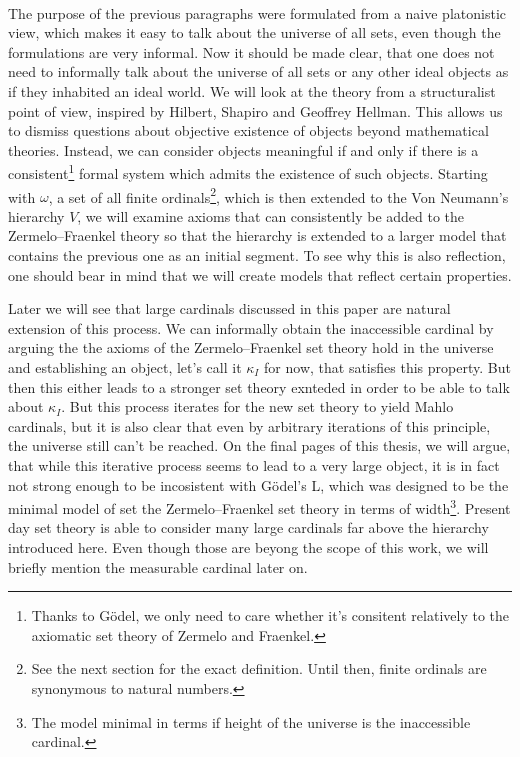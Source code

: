 \

The purpose of the previous paragraphs were formulated from a naive platonistic view, which makes it easy to talk about the universe of all sets, even though the formulations are very informal. Now it should be made clear, that one does not need to informally talk about the universe of all sets or any other ideal objects as if they inhabited an ideal world. We will look at the theory from a structuralist point of view, inspired by Hilbert, Shapiro and Geoffrey Hellman. This allows us to dismiss questions about objective existence of objects beyond mathematical theories. Instead, we can consider objects  meaningful if and only if there is a consistent\footnote{Thanks to Gödel, we only need to care whether it's consitent relatively to the axiomatic set theory of Zermelo and Fraenkel.} formal system which admits the existence of such objects. Starting with $\omega$, a set of all finite ordinals\footnote{See the next section for the exact definition. Until then, finite ordinals are synonymous to natural numbers.}, which is then extended to the Von Neumann's hierarchy $V$, we will examine axioms that can consistently be added to the Zermelo–Fraenkel theory so that the hierarchy is extended to a larger model that contains the previous one as an initial segment. To see why this is also reflection, one should bear in mind that we will create models that reflect certain properties.

Later we will see that large cardinals discussed in this paper are natural extension of this process. We can informally obtain the inaccessible cardinal by arguing the the axioms of the Zermelo–Fraenkel set theory hold in the universe and establishing an object, let's call it $\kappa_I$ for now, that satisfies this property. But then this either leads to a stronger set theory exnteded in order to be able to talk about $\kappa_I$. But this process iterates for the new set theory to yield Mahlo cardinals, but it is also clear that even by arbitrary iterations of this principle, the universe still can't be reached. On the final pages of this thesis, we will argue, that while this iterative process seems to lead to a very large object, it is in fact not strong enough to be incosistent with Gödel's L, which was designed to be the minimal model of set the Zermelo–Fraenkel set theory in terms of width\footnote{The model minimal in terms if height of the universe is the inaccessible cardinal.}. Present day set theory is able to consider many large cardinals far above the hierarchy introduced here. Even though those are beyong the scope of this work, we will briefly mention the measurable cardinal later on.
